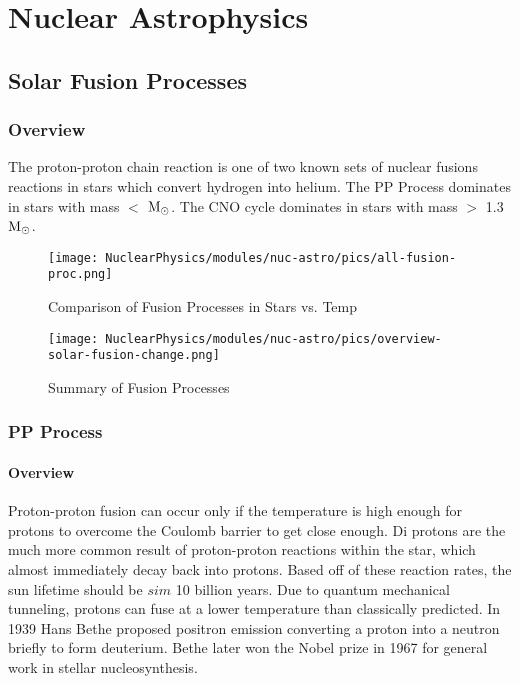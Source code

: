 \chapter{Nuclear Astrophysics}
    \section{Solar Fusion Processes}
        \subsection{Overview}
            The proton-proton chain reaction is one of two known sets of nuclear fusions reactions in stars which convert hydrogen into helium. The PP Process dominates in stars with mass $<$ \(\textup{M}_\odot\). The CNO cycle dominates in stars with mass $>$ 1.3 \(\textup{M}_\odot\).
            
                 
                \begin{figure}[H]
                    \centering
                    \texttt{[image: NuclearPhysics/modules/nuc-astro/pics/all-fusion-proc.png]}
                \caption{Comparison of Fusion Processes in Stars vs. Temp}
                \end{figure}       


            \begin{figure}[H]
                \centering
                \texttt{[image: NuclearPhysics/modules/nuc-astro/pics/overview-solar-fusion-change.png]}
            \caption{Summary of Fusion Processes}
            \end{figure}

           
    
        \subsection{PP Process}
                \subsubsection{Overview}
                    \indent  Proton-proton fusion can occur only if the temperature is high enough for protons to overcome the Coulomb barrier to get close enough. Di protons are the much more common result of proton-proton reactions within the star, which almost immediately decay back into protons. Based off of these reaction rates, the sun lifetime should be $sim$ 10 billion years. Due to quantum mechanical tunneling, protons can fuse at a lower temperature than classically predicted. In 1939 Hans Bethe proposed positron emission converting a proton into a neutron briefly to form deuterium. Bethe later won the Nobel prize in 1967 for general work in stellar nucleosynthesis.
               
